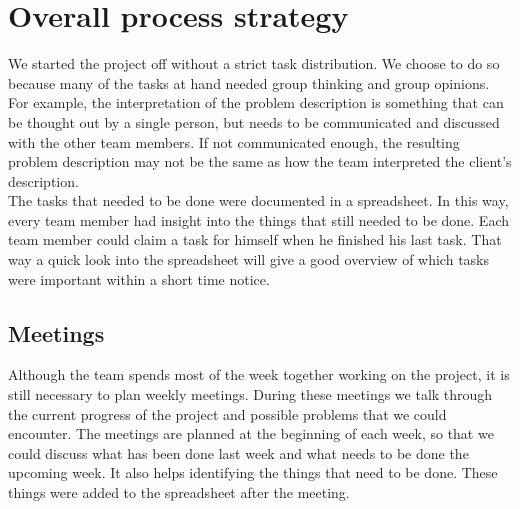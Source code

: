 \section{Overall process strategy}
We started the project off without a strict task distribution.
We choose to do so because many of the tasks at hand needed group thinking and group opinions.
For example, the interpretation of the problem description is something that can be thought out by a single person, but needs to be communicated and discussed with the other team members.
If not communicated enough, the resulting problem description may not be the same as how the team interpreted the client's description.\\
The tasks that needed to be done were documented in a spreadsheet.
In this way, every team member had insight into the things that still needed to be done.
Each team member could claim a task for himself when he finished his last task.
That way a quick look into the spreadsheet will give a good overview of which tasks were important within a short time notice.

\subsection{Meetings}
Although the team spends most of the week together working on the project, it is still necessary to plan weekly meetings.
During these meetings we talk through the current progress of the project and possible problems that we could encounter.
The meetings are planned at the beginning of each week, so that we could discuss what has been done last week and what needs to be done the upcoming week.
It also helps identifying the things that need to be done. These things were added to the spreadsheet after the meeting.

